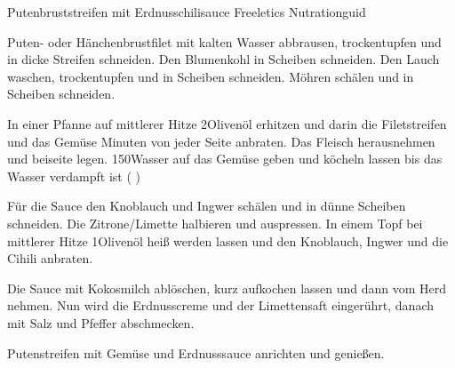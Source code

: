 \begin{recipe}[]{ Putenbruststreifen mit Erdnusschilisauce }{ Freeletics Nutrationguid }



\step
Puten- oder Hänchenbrustfilet mit kalten Wasser abbrausen, trockentupfen und in \cm dicke Streifen schneiden. Den Blumenkohl in Scheiben schneiden. Den Lauch waschen, trockentupfen und in Scheiben schneiden. Möhren schälen und in Scheiben schneiden.

\step
In einer Pfanne auf mittlerer Hitze 2\TL Olivenöl erhitzen und darin die Filetstreifen und das Gemüse  Minuten von jeder Seite anbraten. Das Fleisch herausnehmen und beiseite legen. 150\ml Wasser auf das Gemüse geben und köcheln lassen bis das Wasser verdampft ist ( \min)

\step
Für die Sauce den Knoblauch und Ingwer schälen und in dünne Scheiben schneiden. Die Zitrone/Limette halbieren und auspressen. In einem Topf bei mittlerer Hitze 1\TL Olivenöl heiß werden lassen und den Knoblauch, Ingwer und die Cihili  \min anbraten.

\step
Die Sauce mit Kokosmilch ablöschen, kurz aufkochen lassen und dann vom Herd nehmen. Nun wird die Erdnusscreme und der Limettensaft eingerührt, danach mit Salz und Pfeffer abschmecken.

\step
Putenstreifen mit Gemüse und Erdnusssauce anrichten und  genießen.



\end{recipe}
